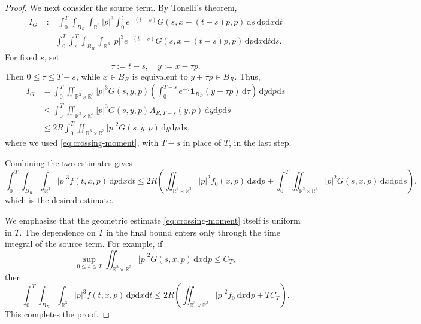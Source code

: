 \documentclass[10pt,a4paper]{amsart}
\newcommand{\R}{\mathbb R}
\newcommand{\dd}{\mathrm d}
\newcommand{\dpp}{\mathrm{d}p}
\newcommand{\ds}{\mathrm{d}s}
\newcommand{\dt}{\mathrm{d}t}
\newcommand{\dx}{\mathrm{d}x}
\newcommand{\dy}{\mathrm{d}y}
\newcommand{\lt}{\left}
\newcommand{\one}{\mathbf 1}
\newcommand{\rt}{\right}
\begin{document}
\begin{proof}
We next consider the source term.  By Tonelli's theorem,
\begin{align*}
 I_G  &:=  \int_0^T\int_{B_R}\int_{\R^3}|p|^3  \int_0^t e^{-(t-s)}  G(s,x-(t-s)p,p)\,\ds  \,\dpp\dx\dt  \\
 &=  \int_0^T\int_s^T\int_{B_R}\int_{\R^3}  |p|^3e^{-(t-s)}  G(s,x-(t-s)p,p)  \,\dpp\dx\dt\ds.
\end{align*}
For fixed $s$, set
\[
 \tau:=t-s,  \quad  y:=x-\tau p.
\]
Then $0\leq\tau\leq T-s$, while $x\in B_R$ is equivalent to $y+\tau p\in B_R$.
Thus,
\begin{align*}
 I_G  &=  \int_0^T  \iint_{\R^3\times\R^3}  |p|^3G(s,y,p)  \lt(  \int_0^{T-s}  e^{-\tau}\one_{B_R}(y+\tau p)\,\dd\tau  \rt)  \,\dy\dpp\ds  \\
 &\leq  \int_0^T  \iint_{\R^3\times\R^3}  |p|^3G(s,y,p)  A_{R,T-s}(y,p)  \,\dy\dpp\ds  \\
 &\leq  2R  \int_0^T  \iint_{\R^3\times\R^3}  |p|^2G(s,y,p)\,\dy\dpp\ds,
\end{align*}
where we used \eqref{eq:crossing-moment}, with $T-s$ in place of $T$, in the last step.

Combining the two estimates gives
\[
\int_0^T\int_{B_R}\int_{\R^3}  |p|^3f(t,x,p)\,\dpp\dx\dt  \leq  2R\lt(  \iint_{\R^3\times\R^3}  |p|^2f_0(x,p)\,\dx\dpp  +  \int_0^T  \iint_{\R^3\times\R^3}  |p|^2G(s,x,p)\,\dx\dpp\ds  \rt),
\]
which is the desired estimate.

We emphasize that the geometric estimate \eqref{eq:crossing-moment} itself is uniform in $T$. The dependence on $T$ in the final bound enters only through the time integral of the source term.  For example, if
\[
 \sup_{0\leq s\leq T}  \iint_{\R^3\times\R^3}  |p|^2G(s,x,p)\,\dx\dpp  \leq C_T,
\]
then
\[
 \int_0^T\int_{B_R}\int_{\R^3}  |p|^3f(t,x,p)\,\dpp\dx\dt  \leq  2R\lt(  \iint_{\R^3\times\R^3}|p|^2f_0\,\dx\dpp  +TC_T  \rt).
\]
This completes the proof.
\end{proof}
\end{document}
